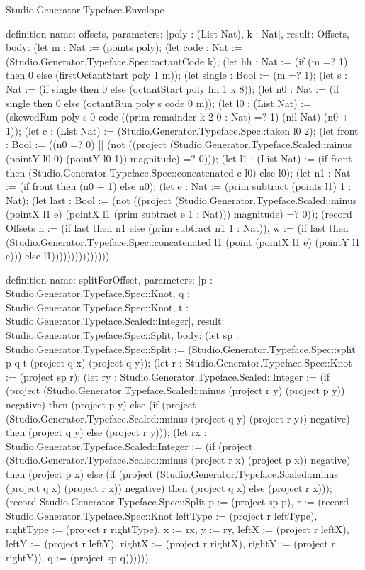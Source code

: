 \begin{lexlean}{Studio.Generator.Typeface.Envelope}
\begin{semanticmodule}
definition{
  name: offsets,
  parameters: [poly : (List Nat), k : Nat],
  result: Offsets,
  body: (let m : Nat := (points poly); (let code : Nat := (Studio.Generator.Typeface.Spec::octantCode k); (let hh : Nat := (if (m =? 1) then 0 else (firstOctantStart poly 1 m)); (let single : Bool := (m =? 1); (let s : Nat := (if single then 0 else (octantStart poly hh 1 k 8)); (let n0 : Nat := (if single then 0 else (octantRun poly s code 0 m)); (let l0 : (List Nat) := (skewedRun poly s 0 code ((prim remainder k 2 0 : Nat) =? 1) (nil Nat) (n0 + 1)); (let c : (List Nat) := (Studio.Generator.Typeface.Spec::taken l0 2); (let front : Bool := ((n0 =? 0) || (not ((project (Studio.Generator.Typeface.Scaled::minus (pointY l0 0) (pointY l0 1)) magnitude) =? 0))); (let l1 : (List Nat) := (if front then (Studio.Generator.Typeface.Spec::concatenated c l0) else l0); (let n1 : Nat := (if front then (n0 + 1) else n0); (let e : Nat := (prim subtract (points l1) 1 : Nat); (let last : Bool := (not ((project (Studio.Generator.Typeface.Scaled::minus (pointX l1 e) (pointX l1 (prim subtract e 1 : Nat))) magnitude) =? 0)); (record Offsets {n := (if last then n1 else (prim subtract n1 1 : Nat)), w := (if last then (Studio.Generator.Typeface.Spec::concatenated l1 (point (pointX l1 e) (pointY l1 e))) else l1)}))))))))))))))
}

definition{
  name: splitForOffset,
  parameters: [p : Studio.Generator.Typeface.Spec::Knot, q : Studio.Generator.Typeface.Spec::Knot, t : Studio.Generator.Typeface.Scaled::Integer],
  result: Studio.Generator.Typeface.Spec::Split,
  body: (let sp : Studio.Generator.Typeface.Spec::Split := (Studio.Generator.Typeface.Spec::split p q t (project q x) (project q y)); (let r : Studio.Generator.Typeface.Spec::Knot := (project sp r); (let ry : Studio.Generator.Typeface.Scaled::Integer := (if (project (Studio.Generator.Typeface.Scaled::minus (project r y) (project p y)) negative) then (project p y) else (if (project (Studio.Generator.Typeface.Scaled::minus (project q y) (project r y)) negative) then (project q y) else (project r y))); (let rx : Studio.Generator.Typeface.Scaled::Integer := (if (project (Studio.Generator.Typeface.Scaled::minus (project r x) (project p x)) negative) then (project p x) else (if (project (Studio.Generator.Typeface.Scaled::minus (project q x) (project r x)) negative) then (project q x) else (project r x))); (record Studio.Generator.Typeface.Spec::Split {p := (project sp p), r := (record Studio.Generator.Typeface.Spec::Knot {leftType := (project r leftType), rightType := (project r rightType), x := rx, y := ry, leftX := (project r leftX), leftY := (project r leftY), rightX := (project r rightX), rightY := (project r rightY)}), q := (project sp q)})))))
}


\end{semanticmodule}
\end{lexlean}

